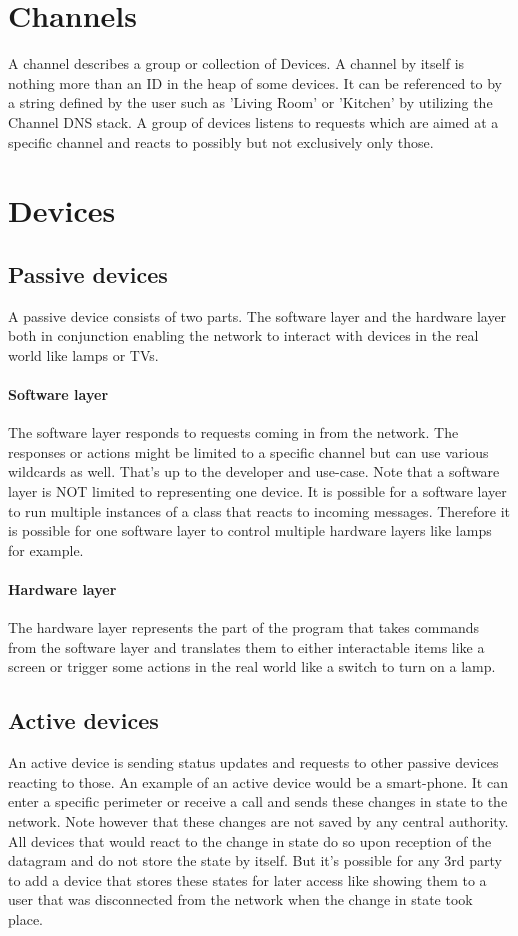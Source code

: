 \documentclass[a4paper]{article}
\begin{document}
	\section{Channels}
	    A channel describes a group or collection of Devices. A channel by itself is nothing more than an ID in the
	    heap of some devices. It can be referenced to by a string defined by the user such as 'Living Room' or 'Kitchen'
	    by utilizing the Channel DNS stack. A group of devices listens to requests which are aimed at a specific channel
	    and reacts to possibly but not exclusively only those.
	\section{Devices}
	    \subsection{Passive devices}
            A passive device consists of two parts. The software layer and the hardware layer both in conjunction
            enabling the network to interact with devices in the real world like lamps or TVs.
            \paragraph{Software layer} The software layer responds to requests coming in from the network. The responses
                or actions might be limited to a specific channel but can use various wildcards as well. That's up to
                the developer and use-case. Note that a software layer is NOT limited to representing one device. It is
                possible for a software layer to run multiple instances of a class that reacts to incoming messages.
                Therefore it is possible for one software layer to control multiple hardware layers
                like lamps for example.

            \paragraph{Hardware layer} The hardware layer represents the part of the program that takes commands from
                the software layer and translates them to either interactable items like a screen or trigger some
                actions in the real world like a switch to turn on a lamp.
        \subsection{Active devices}
            An active device is sending status updates and requests to other passive devices reacting to those. An
            example of an active device would be a smart-phone. It can enter a specific perimeter or receive a call and
            sends these changes in state to the network. Note however that these changes are not saved by any
            central authority. All devices that would react to the change in state do so upon reception of the datagram
            and do not store the state by itself. But it's possible for any 3rd party to add a device that stores these
            states for later access like showing them to a user that was disconnected from the network when the change
            in state took place.
\end{document}
